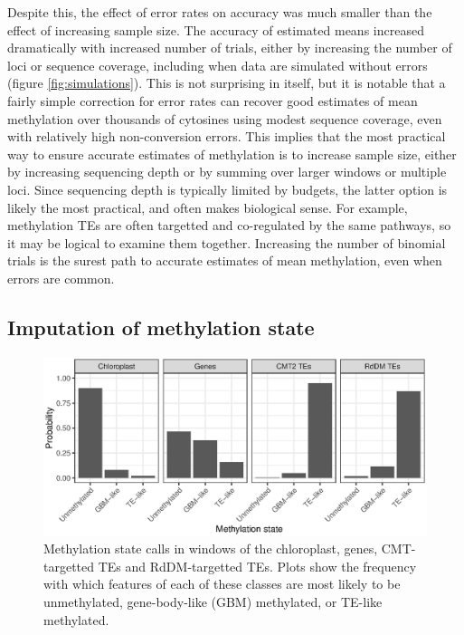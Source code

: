 \documentclass[12pt,longbibliography]{article}
\begin{document}
Despite this, the effect of error rates on accuracy was much smaller than the effect of increasing sample size.
The accuracy of estimated means increased dramatically with increased number of trials, either by increasing the number of loci or sequence coverage, including when data are simulated without errors (figure \ref{fig:simulations}).
This is not surprising in itself, but it is notable that a fairly simple correction for error rates can recover good estimates of mean methylation over thousands of cytosines using modest sequence coverage, even with relatively high non-conversion errors.
This implies that the most practical way to ensure accurate estimates of methylation is to increase sample size, either by increasing sequencing depth or by summing over larger windows or multiple loci.
Since sequencing depth is typically limited by budgets, the latter option is likely the most practical, and often makes biological sense.
For example, methylation TEs are often targetted and co-regulated by the same pathways, so it may be logical to examine them together.
Increasing the number of binomial trials is the surest path to accurate estimates of mean methylation, even when errors are common.

\subsection{Imputation of methylation state}

\begin{figure}
    \centering
    \includegraphics{figure4.eps}
    \caption{
        Methylation state calls in windows of the chloroplast, genes, CMT-targetted TEs and RdDM-targetted TEs.
        Plots show the frequency with which features of each of these classes are most likely to be unmethylated, gene-body-like (GBM) methylated, or TE-like methylated.
    }
    \label{fig:meth-state}
\end{figure}
\end{document}
